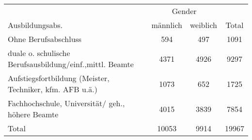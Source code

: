 {
\def\sym#1{\ifmmode^{#1}\else\(^{#1}\)\fi}
\begin{tabular}{l*{3}{c}}
\toprule
            &\multicolumn{2}{c}{Gender}            \\\cmidrule(lr){2-3}
Ausbildungsabs.&    männlich&    weiblich&       Total\\
\midrule
Ohne Berufsabschluss&         594&         497&        1091\\
duale o. schulische Berufsausbildung/einf.,mittl. Beamte&        4371&        4926&        9297\\
Aufstiegsfortbildung (Meister, Techniker, kfm. AFB u.ä.)&        1073&         652&        1725\\
Fachhochschule, Universität/ geh., höhere Beamte&        4015&        3839&        7854\\
Total       &       10053&        9914&       19967\\
\bottomrule
\end{tabular}
}
